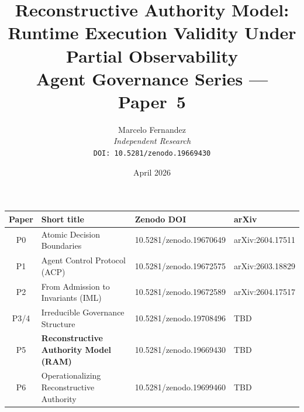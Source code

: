 \documentclass[11pt]{article}
\title{\textbf{Reconstructive Authority Model:}\\
       \textbf{Runtime Execution Validity Under Partial Observability}\\[0.5em]
       \large\normalfont Agent Governance Series --- Paper~5}
\author{Marcelo Fernandez\\
        \small\textit{Independent Research}\\
        \small\texttt{DOI: 10.5281/zenodo.19669430}}
\date{April 2026}
\begin{document}
\maketitle

\begin{center}
\small
\begin{tabular}{clll}
\toprule
\textbf{Paper} & \textbf{Short title} & \textbf{Zenodo DOI} & \textbf{arXiv}\\
\midrule
P0 & Atomic Decision Boundaries~\cite{fernandez2026a}     & 10.5281/zenodo.19670649 & arXiv:2604.17511\\
P1 & Agent Control Protocol (ACP)~\cite{fernandez2026b}   & 10.5281/zenodo.19672575 & arXiv:2603.18829\\
P2 & From Admission to Invariants (IML)~\cite{fernandez2026c} & 10.5281/zenodo.19672589 & arXiv:2604.17517\\
P3/4 & Irreducible Governance Structure~\cite{fernandez2026govstr} & 10.5281/zenodo.19708496 & TBD\\
P5 & \textbf{Reconstructive Authority Model (RAM)} & 10.5281/zenodo.19669430 & TBD\\
P6 & Operationalizing Reconstructive Authority~\cite{fernandez2026op} & 10.5281/zenodo.19699460 & TBD\\
\bottomrule
\end{tabular}
\end{center}
\end{document}

